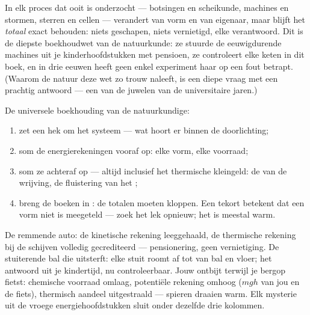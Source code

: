 \begin{proposition}\label{prop:g9:energy-conversions:conservation}
In elk proces dat ooit is onderzocht --- botsingen en scheikunde,
machines en stormen, sterren en cellen --- verandert
 van vorm en van eigenaar, maar blijft het \emph{totaal}
exact behouden: niets geschapen, niets vernietigd, elke
 verantwoord. Dit is de diepste boekhoudwet van de
natuurkunde: ze stuurde de eeuwigdurende machines uit je
kinderhoofdstukken met pensioen, ze controleert elke keten in dit boek,
en in drie eeuwen heeft geen enkel experiment haar op een fout betrapt.
(Waarom de natuur deze wet zo trouw naleeft, is een diepe vraag met een
prachtig antwoord --- een van de juwelen van de universitaire jaren.)
\end{proposition}

\begin{method}\label{met:g9:energy-conversions:audit}
De universele boekhouding van de natuurkundige:
\begin{enumerate}
  \item zet een hek om het systeem --- wat hoort er binnen de
        doorlichting;
  \item som de energierekeningen vooraf op: elke vorm, elke
        voorraad;
  \item som ze achteraf op --- altijd inclusief het thermische
        kleingeld: de  van de wrijving, de fluistering van het
        ;
  \item breng de boeken in : de totalen moeten kloppen. Een
        tekort betekent dat een vorm niet is meegeteld --- zoek het lek
        opnieuw; het is meestal warm.
\end{enumerate}
\end{method}

\begin{example}\label{ex:g9:energy-conversions:audits}
De remmende auto: de kinetische rekening leeggehaald, de thermische
rekening bij de schijven volledig gecrediteerd --- pensionering, geen
vernietiging. De stuiterende bal die uitsterft: elke stuit roomt
 af tot  van bal en vloer; het antwoord uit je
kindertijd, nu controleerbaar. Jouw ontbijt terwijl je bergop fietst:
chemische voorraad omlaag, potentiële rekening omhoog ($m g h$ van jou
en de fiets), thermisch aandeel uitgestraald --- spieren draaien warm.
Elk mysterie uit de vroege energiehoofdstukken sluit onder
dezelfde drie kolommen.
\end{example}

